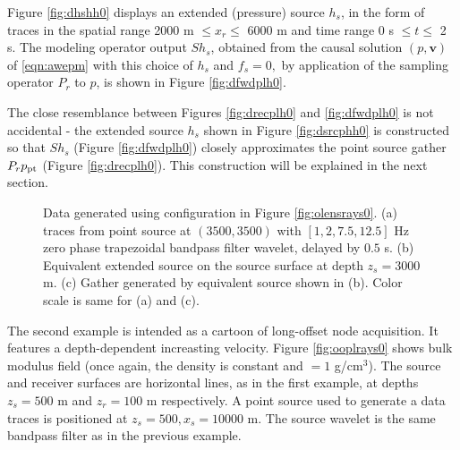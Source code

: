 \documentclass[georeport,12pt]{geophysics}
\newcommand{\bv}{\mathbf{v}}
\begin{document}
Figure \ref{fig:dhshh0} displays an extended (pressure) source $h_s$, in the form of
traces in the spatial range 2000 m $ \le x_r \le $ 6000 m and time
range 0 s $\le t \le $ 2 s. The modeling operator output $Sh_s$,
obtained from the causal solution $(p, \bv)$ of \ref{eqn:awepm}
with this choice of $h_s$ and $f_s=0,$ by application of the sampling
operator $P_r$ to $p$, is shown in Figure \ref{fig:dfwdplh0}.

 The close resemblance between Figures
\ref{fig:drecplh0} and \ref{fig:dfwdplh0} is not accidental  - the
extended source $h_ s$ shown in Figure \ref{fig:dsrcphh0} is constructed
so that $Sh_s$ (Figure \ref{fig:dfwdplh0}) closely
approximates the point source gather $P_r p_{\rm pt}$ (Figure
\ref{fig:drecplh0}). This construction will be explained in the next section.

\begin{figure}
  \centering
  \caption{Data generated using configuration in Figure
    \ref{fig:olensrays0}. (a) traces from point source at $(3500,3500)$
    with $[1, 2, 7.5, 12.5]$ Hz zero phase trapezoidal bandpass
    filter wavelet, delayed by $0.5$ s. (b) Equivalent extended source on
    the source surface at depth $z_s=3000$ m. (c) Gather generated by
    equivalent source shown in (b). Color scale is same for (a) and (c).}
\end{figure}

The second example is intended as a cartoon of long-offset node
acquisition. It features a depth-dependent increasting
velocity. Figure \ref{fig:ooplrays0} shows bulk modulus field (once again, the
density is constant and $= 1$ g/cm$^3$). The source and receiver
surfaces are horizontal lines, as in the first example, at depths
$z_s=500$ m and $z_r= 100$ m respectively. A point source used to
generate a data traces is positioned at $z_s=500, x_s=10000$ m. The
source wavelet is the same bandpass filter as in
the previous example.
\end{document}
